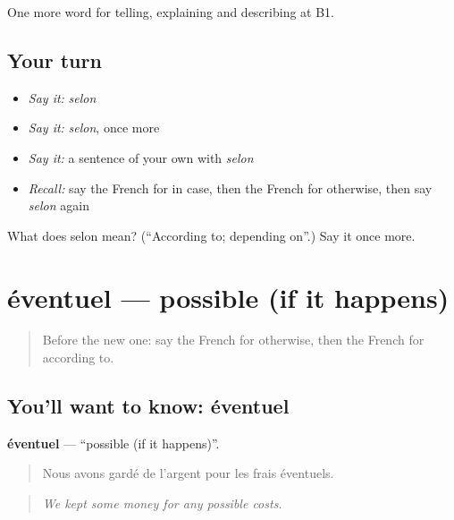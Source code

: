 \begin{grammarlens}[title={What you've built}]
One more word for telling, explaining and describing at B1.
\end{grammarlens}

\subsection*{Your turn}
\begin{itemize}
\raggedright
  \item \emph{Say it:} \emph{selon}
  \item \emph{Say it:} \emph{selon}, once more
  \item \emph{Say it:} a sentence of your own with \emph{selon}
  \item \emph{Recall:} say the French for in case, then the French for otherwise, then say \emph{selon} again
\end{itemize}

\begin{tcolorbox}[breakable,colback=teal!4,colframe=teal!35!black,title={Before you move on}]
What does selon mean? (\textquotedblleft{}According to; depending on\textquotedblright{}.) Say it once more.
\end{tcolorbox}
\section[éventuel]{éventuel — possible (if it happens)}

\label{lesson:FR-C369-eventuel}



\begin{quote}
Before the new one: say the French for otherwise, then the French for according to.
\end{quote}

\subsection*{You'll want to know: éventuel}
\textbf{éventuel} — \textquotedblleft{}possible (if it happens)\textquotedblright{}.

\begin{quote}
Nous avons gardé de l'argent pour les frais éventuels.
\end{quote}

\begin{quote}
\emph{We kept some money for any possible costs.}
\end{quote}

